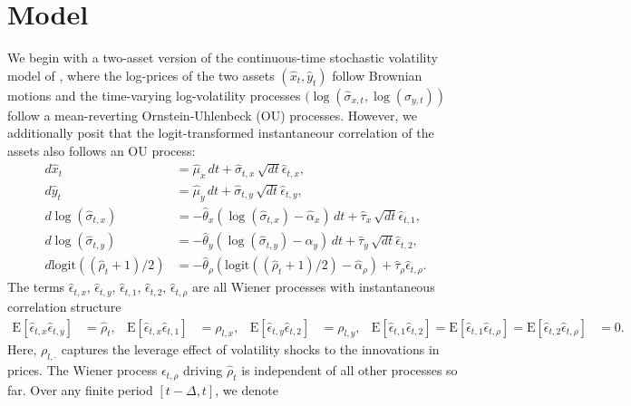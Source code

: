 \documentclass[10pt]{article}
\newcommand{\E}[1]{\mbox{E}\left[#1\right]}
\begin{document}
\section{Model}
We begin with a two-asset version of the continuous-time stochastic
volatility model of \cite{hull1987pricing}, where the log-prices of
the two assets $(\hat{x}_t, \hat{y}_t)$ follow Brownian motions and
the time-varying log-volatility processes
$(\log(\hat{\sigma}_{x,t}, \log(\hat{\sigma}_{y,t}))$ follow a
mean-reverting Ornstein-Uhlenbeck (OU) processes. However, we
additionally posit that the logit-transformed instantaneour
correlation of the assets also follows an OU process:
\begin{align}
  d\hat{x}_t &= \hat{\mu}_x\, dt + \hat{\sigma}_{t,x}\, \sqrt{dt} \hat{\epsilon}_{t,x}  ,  \label{eq:price_evo-x} \\
  d\hat{y}_t &= \hat{\mu}_y\, dt + \hat{\sigma}_{t,y}\, \sqrt{dt} \hat{\epsilon}_{t,y}  ,  \label{eq:price_evo-y} \\
  d\log( \hat{ \sigma }_{t,x}) &= -\hat{\theta}_x ( \log(\hat{\sigma}_{t,x} ) - \hat{\alpha}_x )\, dt + \hat{\tau}_x\, \sqrt{dt} \hat{\epsilon}_{t,1}  ,  \label{eq:vol_evo-x} \\
  d\log( \hat{ \sigma }_{t,y}) &= -\hat{\theta}_y ( \log(\hat{\sigma}_{t,y} ) - \hat{\alpha}_y )\, dt + \hat{\tau}_y\, \sqrt{dt} \hat{\epsilon}_{t,2}  ,  \label{eq:vol_evo-y} \\
  d\mbox{logit}((\hat{\rho}_{t} + 1)/2) &= -\hat{\theta}_\rho\left(\mbox{logit}((\hat{\rho}_{t}+1)/2) - \hat{\alpha}_\rho\right) + \hat{\tau}_{\rho} \hat{\epsilon}_{t,\rho}. \label{eq:correlation-evolution-continuous}
\end{align}
The terms $\hat{\epsilon}_{t,x}$, $\hat{\epsilon}_{t,y}$,
$\hat{\epsilon}_{t,1}$, $\hat{\epsilon}_{t,2}$, $\hat{\epsilon}_{t,\rho}$ are all Wiener
processes with instantaneous correlation structure 
\begin{align*}
  \E{\hat{\epsilon}_{t,x}\hat{\epsilon}_{t,y}} &= \hat{\rho}_t, &\E{\hat{\epsilon}_{t,x}\hat{\epsilon}_{t,1}} &= \rho_{l,x}, & \E{\hat{\epsilon}_{t,y}\hat{\epsilon}_{t,2}} &= \rho_{l,y}, & \E{\hat{\epsilon}_{t,1}\hat{\epsilon}_{t,2}} = \E{\hat{\epsilon}_{t,1}\hat{\epsilon}_{t,\rho}} = \E{\hat{\epsilon}_{t,2}\hat{\epsilon}_{t,\rho}} &= 0.
\end{align*}
Here, $\rho_{l, \cdot}$ captures the leverage effect of volatility
shocks to the innovations in prices. The Wiener process
$\epsilon_{t,\rho}$ driving $\hat{\rho}_t$ is independent of all other
processes so far. Over any finite period $[t-\Delta, t]$, we denote
\end{document}
